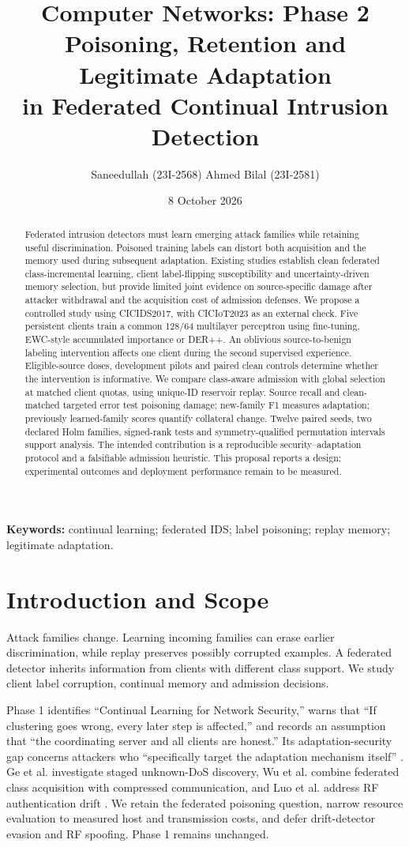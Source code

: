 \documentclass[10pt,a4paper]{article}
\title{\textbf{Computer Networks: Phase 2}\\[5pt]
Poisoning, Retention and Legitimate Adaptation\\
in Federated Continual Intrusion Detection}
\author{Saneedullah (23I-2568) \qquad Ahmed Bilal (23I-2581)}
\date{8 October 2026}
\begin{document}
\maketitle
\begin{abstract}
Federated intrusion detectors must learn emerging attack families while retaining useful discrimination. Poisoned training labels can distort both acquisition and the memory used during subsequent adaptation. Existing studies establish clean federated class-incremental learning, client label-flipping susceptibility and uncertainty-driven memory selection, but provide limited joint evidence on source-specific damage after attacker withdrawal and the acquisition cost of admission defenses. We propose a controlled study using CICIDS2017, with CICIoT2023 as an external check. Five persistent clients train a common 128/64 multilayer perceptron using fine-tuning, EWC-style accumulated importance or DER++. An oblivious source-to-benign labeling intervention affects one client during the second supervised experience. Eligible-source doses, development pilots and paired clean controls determine whether the intervention is informative. We compare class-aware admission with global selection at matched client quotas, using unique-ID reservoir replay. Source recall and clean-matched targeted error test poisoning damage; new-family F1 measures adaptation; previously learned-family scores quantify collateral change. Twelve paired seeds, two declared Holm families, signed-rank tests and symmetry-qualified permutation intervals support analysis. The intended contribution is a reproducible security--adaptation protocol and a falsifiable admission heuristic. This proposal reports a design; experimental outcomes and deployment performance remain to be measured.
\end{abstract}
\noindent\textbf{Keywords:} continual learning; federated IDS; label poisoning; replay memory; legitimate adaptation.

\section{Introduction and Scope}
Attack families change. Learning incoming families can erase earlier discrimination, while replay preserves possibly corrupted examples. A federated detector inherits information from clients with different class support. We study client label corruption, continual memory and admission decisions.

Phase 1 identifies ``Continual Learning for Network Security,'' warns that ``If clustering goes wrong, every later step is affected,'' and records an assumption that ``the coordinating server and all clients are honest.'' Its adaptation-security gap concerns attackers who ``specifically target the adaptation mechanism itself'' \cite{phase1}. Ge et al. investigate staged unknown-DoS discovery, Wu et al. combine federated class acquisition with compressed communication, and Luo et al. address RF authentication drift \cite{ge,wu,luo}. We retain the federated poisoning question, narrow resource evaluation to measured host and transmission costs, and defer drift-detector evasion and RF spoofing. Phase 1 remains unchanged.
\end{document}
